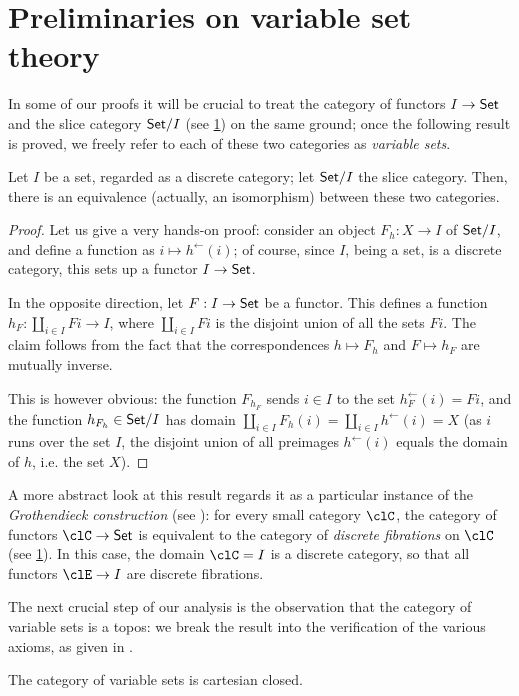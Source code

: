 \documentclass{amsart}
\begin{document}
\section{Preliminaries on variable set theory}
In some of our proofs it will be crucial to treat the category of functors $I \to \mathsf{Set}$ and the slice category $\mathsf{Set}/I$ (see \ref{}) on the same ground; once the following result is proved, we freely refer to each of these two categories as \emph{variable sets}.
\begin{proposition}
Let $I$ be a set, regarded as a discrete category; let $\mathsf{Set}/I$ the slice category. Then, there is an equivalence (actually, an isomorphism) between these two categories.
\end{proposition}
\begin{proof}
  Let us give a very hands-on proof: consider an object $F_h : X\to I$ of $\mathsf{Set}/I$, and define a function as $i\mapsto h^\leftarrow(i)$; of course, since $I$, being a set, is a discrete category, this sets up a functor $I \to \mathsf{Set}$.

  In the opposite direction, let $F : I \to \mathsf{Set}$ be a functor. This defines a function $h_F : \coprod_{i\in I}Fi \to I$, where $\coprod_{i\in I} Fi$ is the disjoint union of all the sets $Fi$.
  The claim follows from the fact that the correspondences $h\mapsto F_h$ and $F\mapsto h_F$ are mutually inverse.

  This is however obvious: the function $F_{h_F}$ sends $i\in I$ to the set $h_F^\leftarrow(i)=Fi$, and the function $h_{F_h} \in \mathsf{Set}/I$ has domain $\coprod_{i\in I}F_h(i) = \coprod_{i\in I}h^\leftarrow(i)=X$ (as $i$ runs over the set $I$, the disjoint union of all preimages $h^\leftarrow(i)$ equals the domain of $h$, i.e. the set $X$).
\end{proof}
\begin{remark}
  A more abstract look at this result regards it as a particular instance of the \emph{Grothendieck construction} (see \cite{}): for every small category $\clC$, the category of functors $\clC\to\Set$ is equivalent to the category of \emph{discrete fibrations} on $\clC$ (see \ref{}). In this case, the domain $\clC=I$ is a discrete category, so that all functors $\clE \to I$ are discrete fibrations.
\end{remark}
The next crucial step of our analysis is the observation that the category of variable sets is a topos: we break the result into the verification of the various axioms, as given in \cite{}.
\begin{proposition}
The category of variable sets is cartesian closed.
\end{proposition}
\end{document}
